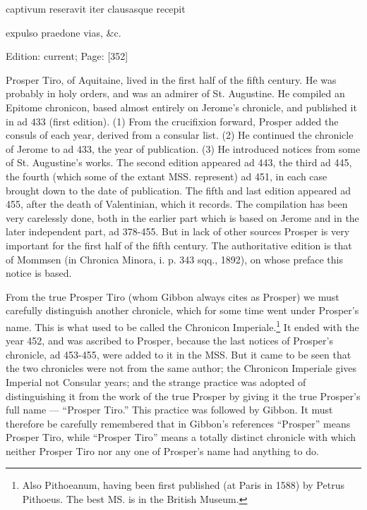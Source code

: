 captivum reseravit iter clausasque recepit

expulso praedone vias, \&c.

Edition: current; Page: [352]

Prosper Tiro, of Aquitaine, lived in the first half of the fifth century. He was probably in holy orders, and was an admirer of St. Augustine. He compiled an Epitome chronicon, based almost entirely on Jerome\texthebrew{}’s chronicle, and published it in ad 433 (first edition). (1) From the crucifixion forward, Prosper added the consuls of each year, derived from a consular list. (2) He continued the chronicle of Jerome to ad 433, the year of publication. (3) He introduced notices from some of St. Augustine\texthebrew{}’s works. The second edition appeared ad 443, the third ad 445, the fourth (which some of the extant MSS. represent) ad 451, in each case brought down to the date of publication. The fifth and last edition appeared ad 455, after the death of Valentinian, which it records. The compilation has been very carelessly done, both in the earlier part which is based on Jerome and in the later independent part, ad 378-455. But in lack of other sources Prosper is very important for the first half of the fifth century. The authoritative edition is that of Mommsen (in Chronica Minora, i. p. 343 sqq., 1892), on whose preface this notice is based.

From the true Prosper Tiro (whom Gibbon always cites as Prosper) we must carefully distinguish another chronicle, which for some time went under Prosper\texthebrew{}’s name. This is what used to be called the Chronicon Imperiale.\footnote{Also Pithoeanum, having been first published (at Paris in 1588) by Petrus Pithoeus. The best MS. is in the British Museum.} It ended with the year 452, and was ascribed to Prosper, because the last notices of Prosper\texthebrew{}’s chronicle, ad 453-455, were added to it in the MSS. But it came to be seen that the two chronicles were not from the same author; the Chronicon Imperiale gives Imperial not Consular years; and the strange practice was adopted of distinguishing it from the work of the true Prosper by giving it the true Prosper\texthebrew{}’s full name \texthebrew{— “}Prosper Tiro.\texthebrew{}” This practice was followed by Gibbon. It must therefore be carefully remembered that in Gibbon\texthebrew{}’s references \texthebrew{“}Prosper\texthebrew{}” means Prosper Tiro, while \texthebrew{“}Prosper Tiro\texthebrew{}” means a totally distinct chronicle with which neither Prosper Tiro nor any one of Prosper\texthebrew{}’s name had anything to do.

